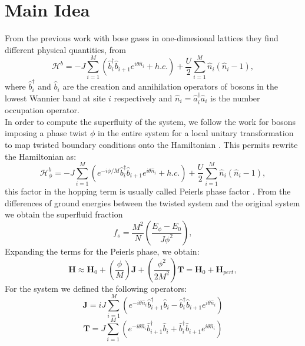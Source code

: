 \documentclass[a4paper, amsfonts, amssymb, amsmath, reprint, showkeys, nofootinbib, twoside]{revtex4-2}
\begin{document}
\section{Main Idea} 
From the previous work with bose gases in one-dimesional lattices \cite{PhysRevA.67.031602} they find different physical quantities, from \cite{doi:10.1126/science.adi3252}
\begin{equation}\label{HamideAny}
\mathcal{H}^b=-J\sum_{i=1}^M \left( \hat{b}_{i}^\dagger   \hat{b}_{i+1} e^{\textit{i} \theta \hat{n}_i} + h.c. \right) + \frac{U}{2} \sum_{i=1}^M \hat{n}_i \left( \hat{n}_i - 1 \right),
\end{equation} 
where $\hat{b}^\dagger_i$ and $\hat{b}_i$ are the creation and annihilation operators of bosons in the lowest Wannier band at site $i$ respectively and $\hat{n}_i = \hat{a}^\dagger_i \hat{a}_i$ is the number occupation operator. \\
In order to compute the superfluity of the system, we follow the work for bosons \cite{PhysRevA.67.031602} imposing a phase twist $\phi$ in the entire system for a local unitary transformation to map twisted boundary conditions onto the Hamiltonian \cite{PhysRevB.44.9562, PhysRevLett.65.243}. This permits rewrite the Hamiltonian as:
\begin{equation}\label{HamideAnyWithPhase}
\mathcal{H}^b_\phi=-J\sum_{i=1}^M \left( e^{-\textit{i}\phi/M} \hat{b}_{i}^\dagger   \hat{b}_{i+1} e^{\textit{i} \theta \hat{n}_i} + h.c. \right) + \frac{U}{2} \sum_{i=1}^M \hat{n}_i \left( \hat{n}_i - 1 \right),
\end{equation} 
this factor in the hopping term is usually called Peierls phase factor \cite{PhysRevLett.65.243}. From the differences of ground energies between the twisted system and the original system we obtain the superfluid fraction \cite{SRapsch_1999}
\begin{equation} 
f_s = \frac{M^2}{N} \left( \frac{E_\phi - E_0}{J \phi^2} \right), 
\end{equation}
Expanding the terms for the Peierls phase, we obtain: 
\begin{equation} 
\textbf{H} \approx  \textbf{H}_0 + \left( \frac{\phi}{M} \right) \textbf{J} + \left( \frac{\phi^2}{2M^2} \right) \textbf{T} = \textbf{H}_0 + \textbf{H}_{pert}, 
\end{equation} 
For the system we defined the following operators: 
\begin{equation} 
\textbf{J} = \textit{i} J \sum_{i=1}^M \left(e^{-\textit{i} \theta\hat{n}_i}  \hat{b}_{i+1}^\dagger\hat{b}_i -   \hat{b}_{i}^\dagger\hat{b}_{i+1} e^{\textit{i} \theta\hat{n}_i} \right)
\end{equation}
\begin{equation} 
\textbf{T} = J \sum_{i=1}^M \left(e^{-\textit{i}\theta\hat{n}_i}  \hat{b}_{i+1}^\dagger\hat{b}_i +   \hat{b}_{i}^\dagger\hat{b}_{i+1} e^{\textit{i}\theta\hat{n}_i} \right)
\end{equation}
\end{document}
